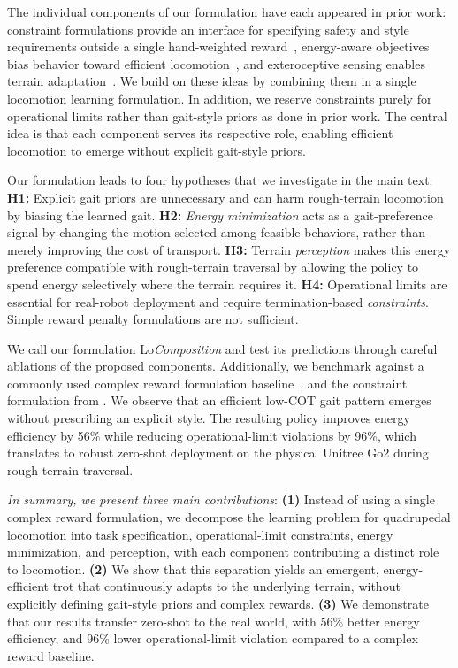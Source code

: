 \documentclass{article}
\begin{document}
    The individual components of our formulation have each appeared in prior work: constraint formulations provide an interface for specifying safety and style requirements outside a single hand-weighted reward~\citep{chane-saneCaTConstraintsTerminations2024a}, energy-aware objectives bias behavior toward efficient locomotion~\citep{schumacher2025emergancenatural}, and exteroceptive sensing enables terrain adaptation~\citep{8460731}. We build on these ideas by combining them in a single locomotion learning formulation. In addition, we reserve constraints purely for operational limits rather than gait-style priors as done in prior work. The central idea is that each component serves its respective role, enabling efficient locomotion to emerge without explicit gait-style priors.

    Our formulation leads to four hypotheses that we investigate in the main text:
    \textbf{H1:} Explicit gait priors are unnecessary and can harm rough-terrain locomotion by biasing the learned gait. 
    \textbf{H2:} \textit{Energy minimization} acts as a gait-preference signal by changing the motion selected among feasible behaviors, rather than merely improving the cost of transport. 
    \textbf{H3:} Terrain \textit{perception} makes this energy preference compatible with rough-terrain traversal by allowing the policy to spend energy selectively where the terrain requires it. 
    \textbf{H4:} Operational limits are essential for real-robot deployment and require termination-based \textit{constraints}. Simple reward penalty formulations are not sufficient.

    We call our formulation Lo\textit{Composition} and test its predictions through careful ablations of the proposed components.
    Additionally, we benchmark against a commonly used complex reward formulation baseline~\citep{rudinLearningWalkMinutes2022a}, and the constraint formulation from \citet{chane-saneCaTConstraintsTerminations2024a}. 
    We observe that an efficient low-COT gait pattern emerges without prescribing an explicit style. The resulting policy improves energy efficiency by 56\% while reducing operational-limit violations by 96\%, which translates to robust zero-shot deployment on the physical Unitree Go2 during rough-terrain traversal.

    \textit{In summary, we present three main contributions}: 
    \textbf{(1)} Instead of using a single complex reward formulation, we decompose the learning problem for quadrupedal locomotion into task specification, operational-limit constraints, energy minimization, and perception, with each component contributing a distinct role to locomotion.
    \textbf{(2)} We show that this separation yields an emergent, energy-efficient trot that continuously adapts to the underlying terrain, without explicitly defining gait-style priors and complex rewards. 
    \textbf{(3)} We demonstrate that our results transfer zero-shot to the real world, with 56\% better energy efficiency, and 96\% lower operational-limit violation compared to a complex reward baseline.
	
\end{document}
